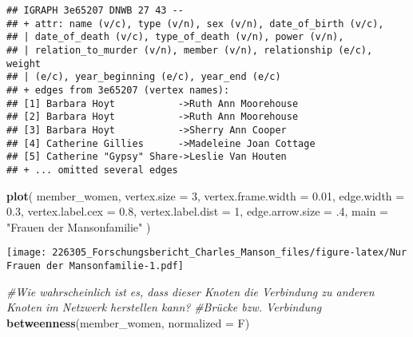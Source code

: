 \documentclass[
]{article}
\newenvironment{Shaded}{\begin{snugshade}}{\end{snugshade}}
\newcommand{\CommentTok}[1]{\textcolor[rgb]{0.56,0.35,0.01}{\textit{#1}}}
\newcommand{\DataTypeTok}[1]{\textcolor[rgb]{0.13,0.29,0.53}{#1}}
\newcommand{\DecValTok}[1]{\textcolor[rgb]{0.00,0.00,0.81}{#1}}
\newcommand{\FloatTok}[1]{\textcolor[rgb]{0.00,0.00,0.81}{#1}}
\newcommand{\KeywordTok}[1]{\textcolor[rgb]{0.13,0.29,0.53}{\textbf{#1}}}
\newcommand{\NormalTok}[1]{#1}
\newcommand{\StringTok}[1]{\textcolor[rgb]{0.31,0.60,0.02}{#1}}
\begin{document}
\begin{verbatim}
## IGRAPH 3e65207 DNWB 27 43 -- 
## + attr: name (v/c), type (v/n), sex (v/n), date_of_birth (v/c),
## | date_of_death (v/c), type_of_death (v/n), power (v/n),
## | relation_to_murder (v/n), member (v/n), relationship (e/c), weight
## | (e/c), year_beginning (e/c), year_end (e/c)
## + edges from 3e65207 (vertex names):
## [1] Barbara Hoyt           ->Ruth Ann Moorehouse   
## [2] Barbara Hoyt           ->Ruth Ann Moorehouse   
## [3] Barbara Hoyt           ->Sherry Ann Cooper     
## [4] Catherine Gillies      ->Madeleine Joan Cottage
## [5] Catherine "Gypsy" Share->Leslie Van Houten     
## + ... omitted several edges
\end{verbatim}

\begin{Shaded}
\begin{Highlighting}[]
\KeywordTok{plot}\NormalTok{(}
\NormalTok{  member_women,}
  \DataTypeTok{vertex.size =} \DecValTok{3}\NormalTok{,}
  \DataTypeTok{vertex.frame.width =} \FloatTok{0.01}\NormalTok{,}
  \DataTypeTok{edge.width =} \FloatTok{0.3}\NormalTok{,}
  \DataTypeTok{vertex.label.cex =} \FloatTok{0.8}\NormalTok{,}
  \DataTypeTok{vertex.label.dist =} \DecValTok{1}\NormalTok{,}
  \DataTypeTok{edge.arrow.size =} \FloatTok{.4}\NormalTok{,}
  \DataTypeTok{main =} \StringTok{"Frauen der Mansonfamilie"}
\NormalTok{)}
\end{Highlighting}
\end{Shaded}

\texttt{[image: 226305\_Forschungsbericht\_Charles\_Manson\_files/figure-latex/Nur Frauen der Mansonfamilie-1.pdf]}

\begin{Shaded}
\begin{Highlighting}[]
\CommentTok{#Wie wahrscheinlich ist es, dass dieser Knoten die Verbindung zu anderen Knoten im Netzwerk herstellen kann? }
\CommentTok{#Brücke bzw. Verbindung}
\KeywordTok{betweenness}\NormalTok{(member_women, }\DataTypeTok{normalized =}\NormalTok{ F)}
\end{Highlighting}
\end{Shaded}
\end{document}
